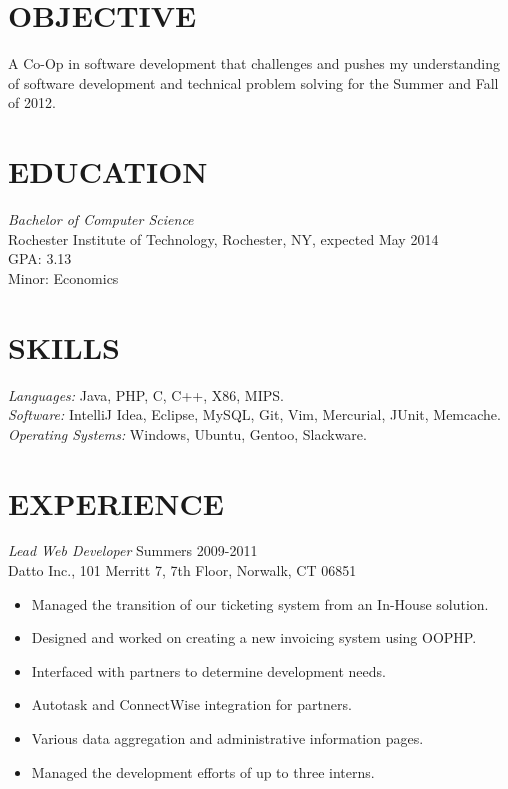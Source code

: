 \documentclass[line,margin]{res}
\begin{document}
\address{2569 Nathaniel Rochester Hall, Rochester, NY 14623}
\address{kurtz.grant@gmail.com |  (203) 240-7149}

 
\begin{resume}
 
\section{OBJECTIVE}       A Co-Op in software development that challenges and pushes my understanding of software development and 
				technical problem solving for the Summer and Fall of 2012.
 
 
\section{EDUCATION} {\sl Bachelor of Computer Science} \\
	 Rochester Institute of Technology, Rochester, NY,  expected May 2014 \\
	GPA: 3.13 \\
	Minor: Economics 
 
\section{SKILLS} {\sl Languages:} Java, PHP, C, C++, X86, MIPS. \\
		{\sl Software:} IntelliJ Idea, Eclipse, MySQL, Git, Vim, Mercurial, JUnit, Memcache. \\
		{\sl Operating Systems:} Windows, Ubuntu, Gentoo, Slackware.
 
\section{EXPERIENCE} {\sl Lead Web Developer} \hfill Summers 2009-2011 \\
                Datto Inc., 
                101 Merritt 7, 7th Floor, Norwalk, CT 06851
                 \begin{itemize}  \itemsep -2pt %
	\item Managed the transition of our ticketing system from an In-House solution.
	\item Designed and worked on creating a new invoicing system using OOPHP.
	\item Interfaced with partners to determine development needs.
	\item Autotask and ConnectWise integration for partners.
	\item Various data aggregation and administrative information pages.
	\item Managed the development efforts of up to three interns.
	\end{itemize}


\end{resume}
\end{document}
